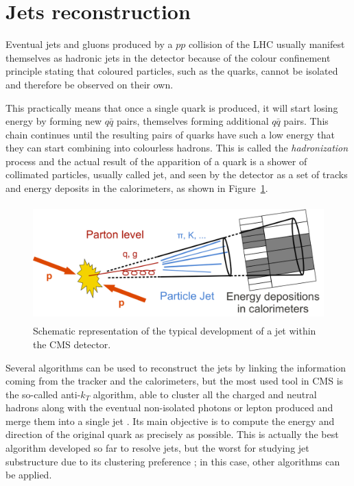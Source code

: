 \documentclass[a4paper, 10pt, openright]{report}
\begin{document}
\section{Jets reconstruction} \label{section:RecoJet}

Eventual jets and gluons produced by a $pp$ collision of the \ac{LHC} usually manifest themselves as hadronic jets in the detector because of the colour confinement principle stating that coloured particles, such as the quarks, cannot be isolated and therefore be observed on their own. 

This practically means that once a single quark is produced, it will start losing energy by forming new $q \bar q$ pairs, themselves forming additional $q \bar q$ pairs. This chain continues until the resulting pairs of quarks have such a low energy that they can start combining into colourless hadrons. This is called the \textit{hadronization} process and the actual result of the apparition of a quark is a shower of collimated particles, usually called jet, and seen by the detector as a set of tracks and energy deposits in the calorimeters, as shown in Figure~\ref{fig:CMSJets}. %

\begin{figure}[htbp]
\begin{center}
\includegraphics[width=12cm, height=4.5cm]{figs/CMSJets.png}
\caption{Schematic representation of the typical development of a jet within the \ac{CMS} detector.}
\label{fig:CMSJets}
\end{center}
\end{figure}

Several algorithms can be used to reconstruct the jets by linking the information coming from the tracker and the calorimeters, but the most used tool in \ac{CMS} is the so-called anti-$k_T$ algorithm, able to cluster all the charged and neutral hadrons along with the eventual non-isolated photons or lepton produced and merge them into a single jet \cite{JetReco}. Its main objective is to compute the energy and direction of the original quark as precisely as possible. This is actually the best algorithm developed so far to resolve jets, but the worst for studying jet substructure due to its clustering preference ; in this case, other algorithms can be applied.
\end{document}
